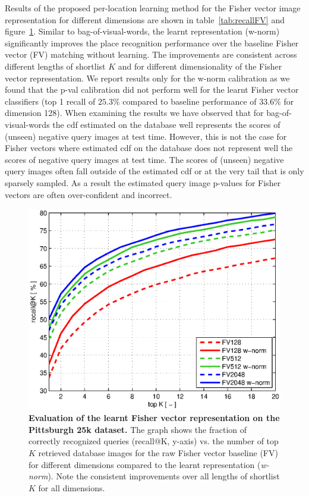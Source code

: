 %
%
    Results of the proposed per-location learning method for the Fisher vector image representation for different dimensions are shown in table~\ref{tab:recallFV} and figure~\ref{fig:recall}.
    Similar to bag-of-visual-words, the learnt representation (w-norm) significantly improves the place recognition performance over the baseline Fisher vector (FV) matching without learning. The improvements are consistent across different lengths of shortlist $K$ and for different dimensionality of the Fisher vector representation. 
    We report results only for the w-norm calibration as we found that the p-val calibration did not perform well for the learnt Fisher vector classifiers (top 1 recall of $25.3\%$ compared to baseline performance of $33.6\%$ for dimension 128). 
    {
      When examining the results we have observed that for bag-of-visual-words the cdf estimated on the database well represents the scores of (unseen) negative query images at test time. However, this is not the case for Fisher vectors where estimated cdf on the database does not represent well the scores of negative query images at test time. The scores of (unseen) negative query images often fall outside of the estimated cdf or at the very tail that is only sparsely sampled.  As a result the estimated query image p-values for Fisher vectors are often over-confident  and incorrect.
    }
    \begin{figure}[t]
        \centering
        \includegraphics[width=1\linewidth]{imgs/plotPitt25kNoBOW.eps}  
        \vspace*{-7mm}
        \caption{
            \textbf{Evaluation of the learnt Fisher vector representation on the Pittsburgh 25k \cite{Gronat13} dataset.} 
            The graph shows the fraction of correctly recognized queries (recall@K, y-axis) vs. the number of top $K$ retrieved database images for the raw Fisher vector baseline (FV) for different dimensions compared to the learnt representation (\emph{w-norm}). Note the consistent improvements over all lengths of shortlist $K$ for all dimensions.
        }
        \label{fig:recall}
    \end{figure}
